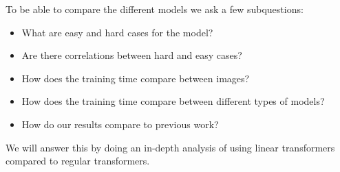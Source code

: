 To be able to compare the different models we ask a few subquestions:
\begin{itemize}
    \item What are easy and hard cases for the model?
    \item Are there correlations between hard and easy cases?
    \item How does the training time compare between images?
    \item How does the training time compare between different types of models?
    \item How do our results compare to previous work?
\end{itemize}

We will answer this by doing an in-depth analysis of using linear transformers compared to regular transformers.

